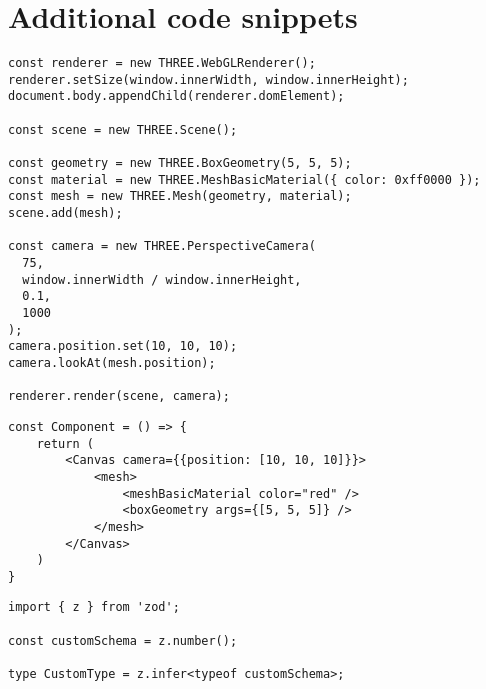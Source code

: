 \chapter{Additional code snippets} 

\begin{lstlisting}[caption={~Creating and displaying a 3D red cube with Three.js},label={lst:threejs},captionpos=b,float,abovecaptionskip=\medskipamount,belowcaptionskip=\medskipamount]
const renderer = new THREE.WebGLRenderer();
renderer.setSize(window.innerWidth, window.innerHeight);
document.body.appendChild(renderer.domElement);

const scene = new THREE.Scene();

const geometry = new THREE.BoxGeometry(5, 5, 5);
const material = new THREE.MeshBasicMaterial({ color: 0xff0000 });
const mesh = new THREE.Mesh(geometry, material);
scene.add(mesh);

const camera = new THREE.PerspectiveCamera(
  75,
  window.innerWidth / window.innerHeight,
  0.1,
  1000
);
camera.position.set(10, 10, 10);
camera.lookAt(mesh.position);

renderer.render(scene, camera);

\end{lstlisting}


\begin{lstlisting}[caption={~Creating a 3D red cube as a React component with R3F},label={lst:r3f},captionpos=b,float,abovecaptionskip=\medskipamount,belowcaptionskip=\medskipamount]
const Component = () => {
    return (
        <Canvas camera={{position: [10, 10, 10]}}>
            <mesh>
                <meshBasicMaterial color="red" />
                <boxGeometry args={[5, 5, 5]} />
            </mesh>
        </Canvas>
    )
}
\end{lstlisting}

\begin{lstlisting}[caption={~Conversion from Zod schema to TypeScript type},label={lst:zod},captionpos=b,float,abovecaptionskip=\medskipamount,belowcaptionskip=\medskipamount]
import { z } from 'zod';

const customSchema = z.number();

type CustomType = z.infer<typeof customSchema>;
\end{lstlisting}